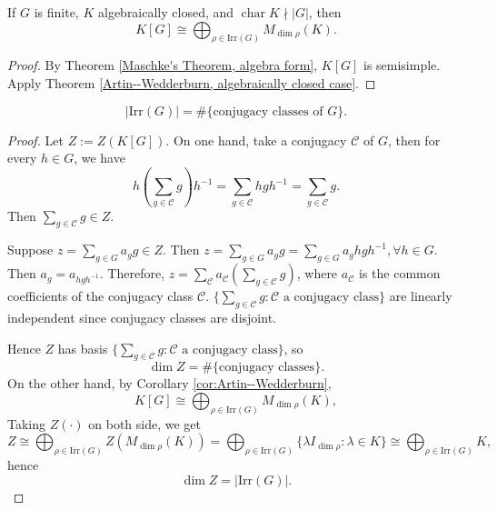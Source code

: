 \begin{cor}
\label{cor:Artin--Wedderburn}
If \(G\) is finite, \(K\) algebraically closed, and \(\operatorname{char} K \nmid |G|\), then
\[
K[G] \cong \bigoplus_{\rho \in \mathrm{Irr}(G)} M_{\dim \rho}(K).
\]
\end{cor}

\begin{proof}
By Theorem \ref{Maschke's Theorem, algebra form}, \(K[G]\) is semisimple. Apply Theorem \ref{Artin--Wedderburn, algebraically closed case}.
\end{proof}

\begin{thm}\label{thm:count irr_conj}
\[
|\mathrm{Irr}(G)| = \#\{\text{conjugacy classes of } G\}.
\]
\end{thm}

\begin{proof}
Let \(Z := Z(K[G])\). On one hand, take a conjugacy $\mathcal{C}$ of $G$, then for every $h\in G$, we have \[h\left(\sum_{g \in \mathcal{C}} g\right)h^{-1}=\sum_{g \in \mathcal{C}} hgh^{-1}=\sum_{g \in \mathcal{C}} g.\]
Then $\sum_{g \in \mathcal{C}} g\in Z$.

Suppose $z=\sum_{g \in G} a_g g\in Z$.
Then $z=\sum_{g \in G} a_g g=\sum_{g \in G} a_g hgh^{-1},\forall h\in G$.
Then $a_g=a_{hgh^{-1}}$.
Therefore, $z=\sum_{ \mathcal{C}}a _{\mathcal{C}}\left(\sum_{g \in \mathcal{C}} g\right)$, where $a_{\mathcal{C}}$ is the common coefficients of the conjugacy class $\mathcal{C}$. \(\{\sum_{g \in \mathcal{C}} g : \mathcal{C} \text{ a conjugacy class}\}\) are linearly independent since conjugacy classes are disjoint. 

Hence \(Z\) has basis \(\{\sum_{g \in \mathcal{C}} g : \mathcal{C} \text{ a conjugacy class}\}\), so
\[
\dim Z = \#\{\text{conjugacy classes}\}.
\]
On the other hand, by Corollary \ref{cor:Artin--Wedderburn},
\[
K[G] \cong \bigoplus_{\rho \in \mathrm{Irr}(G)} M_{\dim \rho}(K),
\]
Taking $Z(\cdot)$ on both side, we get
\[
Z \cong \bigoplus_{\rho \in \mathrm{Irr}(G)} Z(M_{\dim \rho}(K)) =\bigoplus_{\rho \in \mathrm{Irr}(G)} \{\lambda I_
{\operatorname{dim}\rho}:\lambda \in K\}\cong \bigoplus_{\rho \in \mathrm{Irr}(G)} K,
\]
hence
\[
\dim Z = |\mathrm{Irr}(G)|.
\]
\end{proof}
